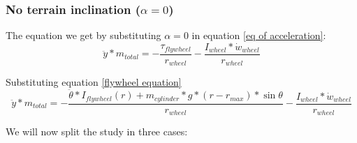 \subsubsection{No terrain inclination ($\alpha = 0$)}
The equation we get by substituting $\alpha = 0$ in equation \ref{eq of acceleration}:
\[\ddot{y}*m_{total} = - \frac{\tau_{flywheel}}{r_{wheel}} - \frac{I_{wheel} * \dot{w}_{wheel}}{r_{wheel}}\]

Substituting equation \ref{flywheel equation}
\begin{equation}\label{no inclintation eq}
    \ddot{y}*m_{total} = - \frac{\ddot{\theta}*I_{flywheel}(r) + m_{cylinder} * g * (r - r_{max}) * \sin{\theta}}{r_{wheel}} - \frac{I_{wheel} * \dot{w}_{wheel}}{r_{wheel}}
\end{equation}


We will now split the study in  three cases:
